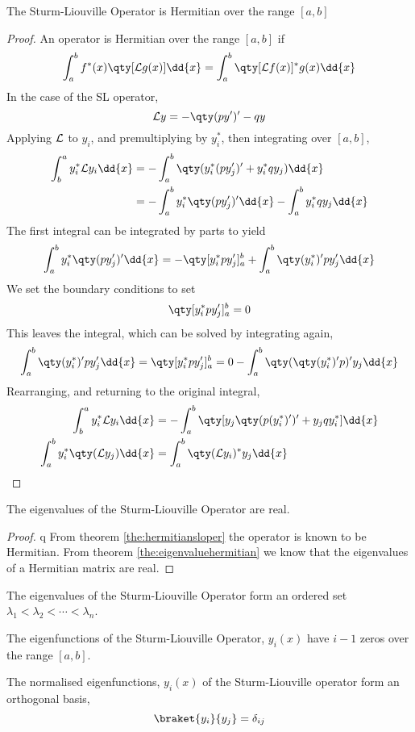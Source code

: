 \begin{theorem}
\begin{subtheorem}
\label{the:hermitiansloper}
  The Sturm-Liouville Operator is Hermitian over the range $[a,b]$
\end{subtheorem}
\begin{proof}
  An operator is Hermitian over the range $[a,b]$ if
  \[ \int_a^b f^{*}(x) \qty[ {\cal L} g(x)] \dd{x} = \int_a^b
  \qty[{\cal L} f(x)]^{*} g(x) \dd{x} \] In the case of the SL
  operator, \[ {\cal L} y = - \qty( p y^{\prime})^{\prime} - qy \]
  Applying ${\cal L}$ to $y_i$, and premultiplying by $y_i^{*}$, then
  integrating over $[a,b]$,
  \begin{align*}
    \int_b^a y_i^{*} {\cal L} y_i \dd{x} &= - \int_a^b \qty( y_i^{*} (p y_j^{\prime})^{\prime} + y_i^{*} q y_j ) \dd{x} \\
&= - \int_a^b y_i^{*} \qty(p y^{\prime}_j)^{\prime} \dd{x} - \int_a^b y_i^{*} q y_j \dd{x}
  \end{align*}
  The first integral can be integrated by parts to yield
  \[ \int_a^b y_i^{*} \qty(p y^{\prime}_j)^{\prime} \dd{x} = -
  \qty[y_i^{*} p y^{\prime}_j]_a^b + \int_a^b \qty(y_i^{*})^{\prime} p
  y_j^{\prime} \dd{x} \] We set the boundary conditions to set
  \[ \qty[y_i^{*} p y^{\prime}_j]_a^b = 0 \] This leaves the integral,
  which can be solved by integrating again,
  \[ \int_a^b \qty(y_i^{*})^{\prime} p y_j^{\prime} \dd{x} =
  \qty[y_i^{*} p y^{\prime}_j]_a^b = 0 - \int_a^b \qty(
  \qty(y_i^{*})^{\prime} p )^{\prime} y_j \dd{x} \] Rearranging, and
  returning to the original integral,
  \begin{align*}
    \int_b^a y_i^{*} {\cal L} y_i \dd{x} &= - \int_a^b \qty[ y_j \qty( p (y_i^{*})^{\prime} )^{\prime} + y_j q y_i^{*}] \dd{x} \\
\int_a^b y_i^{*} \qty( {\cal L} y_j ) \dd{x} &= \int_a^b \qty( {\cal L} y_i)^{*} y_j \dd{x}
  \end{align*}
\end{proof}
\begin{subtheorem}
  The eigenvalues of the Sturm-Liouville Operator are real.
\end{subtheorem}
\begin{proof}q From theorem \ref{the:hermitiansloper} the operator is
  known to be Hermitian.  From theorem \ref{the:eigenvaluehermitian}
  we know that the eigenvalues of a Hermitian matrix are real.
\end{proof}
\begin{subtheorem}
  The eigenvalues of the Sturm-Liouville Operator form an ordered set $\lambda_1 < \lambda_2 < \cdots < \lambda_n$.
\end{subtheorem}
\begin{subtheorem}
  The eigenfunctions of the Sturm-Liouville Operator, $y_i(x)$ have
  $i-1$ zeros over the range $[a,b]$.
\end{subtheorem}
\begin{subtheorem}
  The normalised eigenfunctions, $y_i(x)$ of the Sturm-Liouville operator form an orthogonal basis,
  \[ \braket{y_i}{y_j} = \delta_{ij} \]
\end{subtheorem}
\end{theorem}


